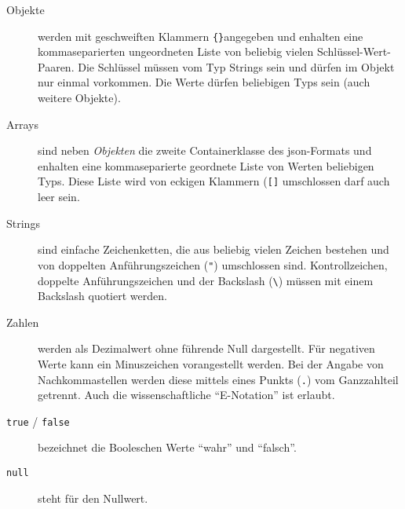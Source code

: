 \begin{description}
    \item[Objekte] werden mit geschweiften Klammern \texttt{\{\}}angegeben und enhalten eine kommaseparierten ungeordneten Liste von beliebig vielen Schlüssel-Wert-Paaren. Die Schlüssel müssen vom Typ Strings sein und dürfen im Objekt nur einmal vorkommen. Die Werte dürfen beliebigen Typs sein (auch weitere Objekte).
    \item[Arrays] sind neben \emph{Objekten} die zweite Containerklasse des \acrshort{json}-Formats und enhalten eine kommaseparierte geordnete Liste von Werten beliebigen Typs. Diese Liste wird von eckigen Klammern (\texttt{[]} umschlossen darf auch leer sein.
    \item[Strings] sind einfache Zeichenketten, die aus beliebig vielen Zeichen bestehen und von doppelten Anführungszeichen (\texttt{"}) umschlossen sind. Kontrollzeichen, doppelte Anführungszeichen und der Backslash (\texttt{\textbackslash})  müssen mit einem Backslash quotiert werden.
    \item[Zahlen] werden als Dezimalwert ohne führende Null dargestellt. Für negativen Werte kann ein Minuszeichen vorangestellt werden. Bei der Angabe von Nachkommastellen werden diese mittels eines Punkts (\texttt{.}) vom Ganzzahlteil getrennt. Auch die wissenschaftliche \enquote{E-Notation} ist erlaubt.
    \item[\texttt{true} / \texttt{false}] bezeichnet die Booleschen Werte \enquote{wahr} und \enquote{falsch}.
    \item[\texttt{null}] steht für den Nullwert.
\end{description}

